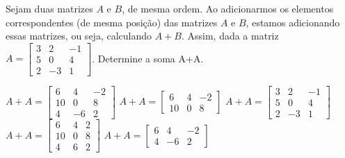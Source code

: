 Sejam duas matrizes $A$ e $B$, de mesma ordem. Ao adicionarmos os elementos correspondentes (de mesma posição) das matrizes $A$ e $B$, estamos adicionando essas matrizes, ou seja, calculando $A+B$. Assim, dada a matriz $A = \left[ \begin{array}{ccc}
3 & 2 & -1 \\
5 & 0 & 4 \\
2 & -3 & 1
\end{array} \right]$. Determine a soma A+A.

$A+A = \left[ \begin{array}{ccc} 6 & 4 & -2 \\ 10 & 0 & 8 \\ 4 & -6 & 2 \end{array} \right]$
$A+A = \left[ \begin{array}{ccc} 6 & 4 & -2 \\ 10 & 0 & 8 \end{array} \right]$
$A+A = \left[ \begin{array}{ccc} 3 & 2 & -1 \\ 5 & 0 & 4 \\ 2 & -3 & 1 \end{array} \right]$
$A+A = \left[ \begin{array}{ccc} 6 & 4 & 2 \\ 10 & 0 & 8 \\ 4 & 6 & 2 \end{array} \right]$
$A+A = \left[ \begin{array}{ccc} 6 & 4 & -2 \\ 4 & -6 & 2 \end{array} \right]$


